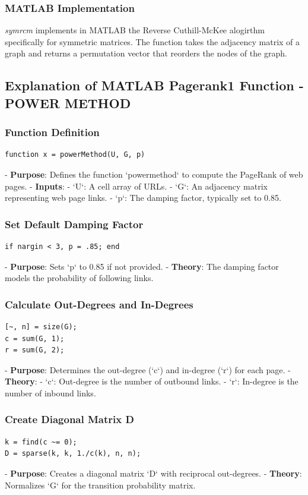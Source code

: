 \documentclass[unicode,11pt,a4paper,oneside,numbers=endperiod,openany]{scrartcl}
\begin{document}
\subsubsection{MATLAB Implementation}
\textit{symrcm} implements in MATLAB the Reverse Cuthill-McKee alogirthm specifically for symmetric matrices. The function takes the adjacency matrix of a graph and returns a permutation vector that reorders the nodes of the graph.


\subsection{Explanation of MATLAB Pagerank1 Function - POWER METHOD}

\subsubsection{Function Definition}
\begin{lstlisting}
function x = powerMethod(U, G, p)
\end{lstlisting}
- \textbf{Purpose}: Defines the function `powermethod` to compute the PageRank of web pages.
- \textbf{Inputs}:
  - `U`: A cell array of URLs.
  - `G`: An adjacency matrix representing web page links.
  - `p`: The damping factor, typically set to 0.85.

\subsubsection{Set Default Damping Factor}
\begin{lstlisting}
if nargin < 3, p = .85; end
\end{lstlisting}
- \textbf{Purpose}: Sets `p` to 0.85 if not provided.
- \textbf{Theory}: The damping factor models the probability of following links.

\subsubsection{Calculate Out-Degrees and In-Degrees}
\begin{lstlisting}
[~, n] = size(G);
c = sum(G, 1);
r = sum(G, 2);
\end{lstlisting}
- \textbf{Purpose}: Determines the out-degree (`c`) and in-degree (`r`) for each page.
- \textbf{Theory}:
  - `c`: Out-degree is the number of outbound links.
  - `r`: In-degree is the number of inbound links.

\subsubsection{Create Diagonal Matrix D}
\begin{lstlisting}
k = find(c ~= 0);
D = sparse(k, k, 1./c(k), n, n);
\end{lstlisting}
- \textbf{Purpose}: Creates a diagonal matrix `D` with reciprocal out-degrees.
- \textbf{Theory}: Normalizes `G` for the transition probability matrix.
\end{document}
